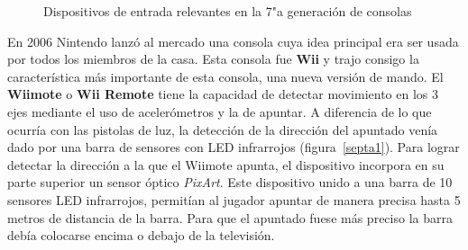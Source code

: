 \begin{figure}[t]
     \hfill
{}
     \caption{Dispositivos de entrada relevantes en la 7"a  generaci\'on de consolas}
     \label{fig:septima}
   \end{figure}

En 2006 Nintendo lanz\'o al mercado una consola cuya idea principal era ser usada por todos los miembros de la casa. Esta consola fue \textbf{Wii} y trajo consigo la caracter\'istica m\'as importante de esta consola, una nueva versi\'on de mando. El \textbf{Wiimote} o \textbf{Wii Remote} tiene la capacidad de detectar movimiento en los 3 ejes mediante el uso de aceler\'ometros y la de apuntar. A diferencia de lo que ocurr\'ia con las pistolas de luz, la detecci\'on de la direcci\'on del apuntado ven\'ia dado por una barra de sensores con LED infrarrojos (figura~\ref{septa1}). Para lograr detectar la direcci\'on a la que el Wiimote apunta, el dispositivo incorpora en su parte superior un sensor \'optico \textit{PixArt}. Este dispositivo unido a una barra de 10 sensores LED infrarrojos, permit\'ian al jugador apuntar de manera precisa hasta 5 metros de distancia de la barra. Para que el apuntado fuese m\'as preciso la barra deb\'ia colocarse encima o debajo de la televisi\'on.\\

